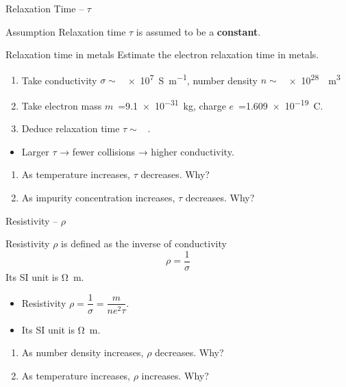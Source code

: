 %
\begin{frame}{Relaxation Time -- \(\tau\)}
	\begin{block}{Assumption}
		Relaxation time \(\tau\) is assumed to be a \textbf{constant}.
	\end{block}
	\begin{guesstimate}{Relaxation time in metals}
		Estimate the electron relaxation time in metals.
		\begin{enumerate}\itemsep0pt\parskip0pt 
			\item Take conductivity \(\sigma \sim\)~\SI{e7}{\siemens\per\metre}, number density \(n \sim\)~\SI{e28}{\per\metre\cubed}
			\item Take electron mass  \(m\)~=\SI{9.1e-31}{\kilo\gram}, charge \(e\)~=\SI{1.609e-19}{\coulomb}.
			\item Deduce relaxation time \( \tau \sim\)~ .
		\end{enumerate}
	\end{guesstimate}
	\begin{itemize}
		\item Larger $\tau$ → fewer collisions → higher conductivity.
	\end{itemize}
	\begin{trends}
		\begin{enumerate}\itemsep0pt\parskip0pt 
			\item As temperature increases, \(\tau\) decreases. \hfill Why?
			\item As impurity concentration increases, \(\tau\) decreases. \hfill Why?
		\end{enumerate}
	\end{trends}
\end{frame}
%
\begin{frame}{Resistivity -- \(\rho\)}
	\begin{definition}
		Resistivity \(\rho\) is defined as the inverse of conductivity
		\[
		\rho = \frac{1}{\sigma}
		\]
		Its SI unit is \si{\ohm\metre}.
	\end{definition}
	\begin{itemize}
		\item Resistivity $\rho = \dfrac{1}{\sigma} = \dfrac{m}{ne^2\tau}$.
		\item Its SI unit is \si{\ohm\metre}.
	\end{itemize}
	\begin{trends}
		\begin{enumerate}\itemsep0pt\parskip0pt \parsep0pt
			\item As number density increases, $\rho$ decreases. \hfill Why?
			\item As temperature increases, $\rho$ increases. \hfill Why?
		\end{enumerate}
	\end{trends}
\end{frame}

